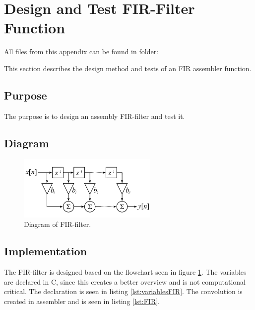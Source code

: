 \section{Design and Test FIR-Filter Function}

All files from this appendix can be found in folder: \\

This section describes the design method and tests of an FIR assembler function. 

\subsection{Purpose}
The purpose is to design an assembly FIR-filter and test it.%


\subsection{Diagram}

\begin{figure}[H]
	\centering
	\includegraphics[width=0.6\textwidth]{../Journal/Code/FIRfilter}
	\caption{Diagram of FIR-filter\cite{FIRWiki}.}
	\label{Fig:FIR_filter2}
\end{figure}

\subsection{Implementation}
The FIR-filter is designed based on the flowchart seen in figure \ref{Fig:FIR_filter2}. 
The variables are declared in C, since this creates a better overview and is not computational critical. The declaration is seen in listing \ref{lst:variablesFIR}. The convolution is created in assembler and is seen in listing \ref{lst:FIR}.

